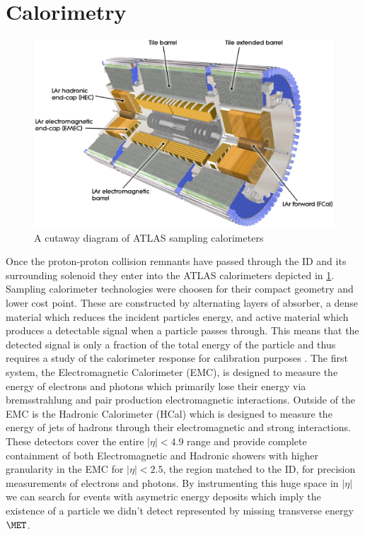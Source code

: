 \section{Calorimetry} \label{sec:atlas:calorimetry}

\begin{figure}[!htbp]
  \begin{center}
    \includegraphics[width=0.8\linewidth]{figures/atlas/calorimeter_cutaway}
    \caption{ \cite{PERF-2007-01} A cutaway diagram of ATLAS sampling calorimeters}
    \label{fig:calorimeter_cutaway}
  \end{center}
\end{figure}

Once the proton-proton collision remnants have passed through the ID and its
surrounding solenoid they enter into the ATLAS calorimeters depicted in
\cref{fig:calorimeter_cutaway}.  Sampling calorimeter technologies were choosen
for their compact geometry and lower cost point.  These are constructed by
alternating layers of absorber, a dense material which reduces the incident
particles energy, and active material which produces a detectable signal when a
particle passes through.  This means that the detected signal is only a fraction
of the total energy of the particle and thus requires a study of the calorimeter
response for calibration purposes \cite{Fabjan:692252}. The first system, the
Electromagnetic Calorimeter (EMC), is designed to measure the energy of
electrons and photons which primarily lose their energy via bremsstrahlung and
pair production electromagnetic interactions.  Outside of the EMC is the
Hadronic Calorimeter (HCal) which is designed to measure the energy of jets of
hadrons through their electromagnetic and strong interactions. These detectors
cover the entire $|\eta| < 4.9$ range and provide complete containment of both
Electromagnetic and Hadronic showers with higher granularity in the EMC for
$|\eta| < 2.5$, the region matched to the ID, for precision measurements of
electrons and photons.  By instrumenting this huge space in $|\eta|$ we can
search for events with asymetric energy deposits which imply the existence of a
particle we didn't detect represented by missing transverse energy $\MET$.

